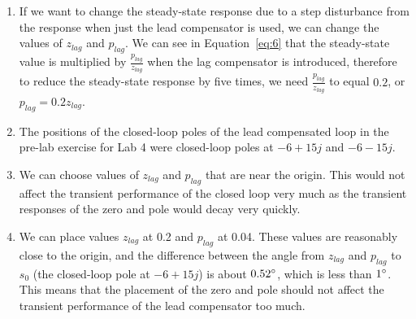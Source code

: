 \documentclass[12pt]{article}
\begin{document}
\begin{enumerate}
	\item %
	If we want to change the steady-state response due to a step disturbance from the response when just the lead compensator is used, we can change the values of $z_{lag}$ and $p_{lag}$. We can see in Equation~\ref{eq:6} that the steady-state value is multiplied by $\frac{p_{lag}}{z_{lag}}$ when the lag compensator is introduced, therefore to reduce the steady-state response by five times, we need $\frac{p_{lag}}{z_{lag}}$ to equal $0.2$, or $p_{lag} = 0.2 z_{lag}$.

	\item %
	The positions of the closed-loop poles of the lead compensated loop in the pre-lab exercise for Lab 4 were closed-loop poles at $-6 + 15j$ and $-6 - 15j$.
	
	\item %
	We can choose values of $z_{lag}$ and $p_{lag}$ that are near the origin. This would not affect the transient performance of the closed loop very much as the transient responses of the zero and pole would decay very quickly. 
	
	\item %
	We can place values $z_{lag}$ at 0.2 and $p_{lag}$ at 0.04. These values are reasonably close to the origin, and the difference between the angle from $z_{lag}$ and $p_{lag}$ to $s_0$ (the closed-loop pole at $-6 + 15j$) is about $0.52 \degree$, which is less than $1 \degree$. This means that the placement of the zero and pole should not affect the transient performance of the lead compensator too much.
	
\end{enumerate}
\end{document}
